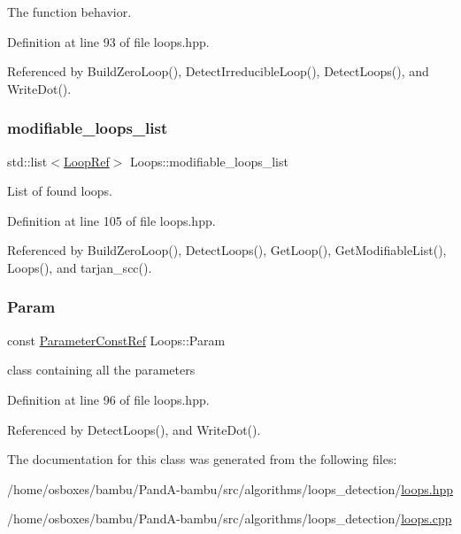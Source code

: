 The function behavior. 



Definition at line 93 of file loops.\+hpp.



Referenced by Build\+Zero\+Loop(), Detect\+Irreducible\+Loop(), Detect\+Loops(), and Write\+Dot().

\mbox{\label{classLoops_a5c8561d32679c74ff5998df3d7370d2f}} 
\subsubsection{\texorpdfstring{modifiable\+\_\+loops\+\_\+list}{modifiable\_loops\_list}}
{\footnotesize\ttfamily std\+::list$<$\hyperlink{loop_8hpp_aa4a60313089619376f67557c4120423c}{Loop\+Ref}$>$ Loops\+::modifiable\+\_\+loops\+\_\+list\hspace{0.3cm}{\ttfamily [private]}}



List of found loops. 



Definition at line 105 of file loops.\+hpp.



Referenced by Build\+Zero\+Loop(), Detect\+Loops(), Get\+Loop(), Get\+Modifiable\+List(), Loops(), and tarjan\+\_\+scc().

\mbox{\label{classLoops_a756be6e3fec1b2c4b9518c6461dc009a}} 
\subsubsection{\texorpdfstring{Param}{Param}}
{\footnotesize\ttfamily const \hyperlink{Parameter_8hpp_a37841774a6fcb479b597fdf8955eb4ea}{Parameter\+Const\+Ref} Loops\+::\+Param\hspace{0.3cm}{\ttfamily [private]}}



class containing all the parameters 



Definition at line 96 of file loops.\+hpp.



Referenced by Detect\+Loops(), and Write\+Dot().



The documentation for this class was generated from the following files\+:\begin{DoxyCompactItemize}
\item 
/home/osboxes/bambu/\+Pand\+A-\/bambu/src/algorithms/loops\+\_\+detection/\hyperlink{loops_8hpp}{loops.\+hpp}\item 
/home/osboxes/bambu/\+Pand\+A-\/bambu/src/algorithms/loops\+\_\+detection/\hyperlink{loops_8cpp}{loops.\+cpp}\end{DoxyCompactItemize}
